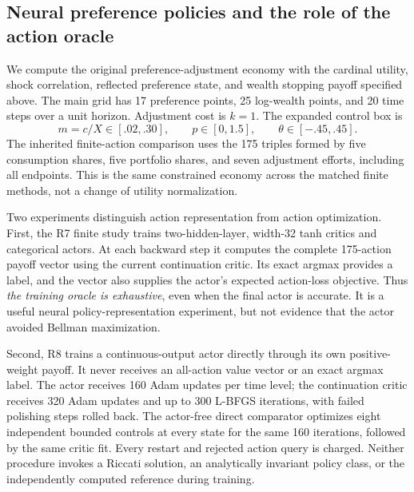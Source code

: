 \subsection{Neural preference policies and the role of the action oracle}\label{sec:ndu-neural}
We compute the original preference-adjustment economy with the cardinal utility, shock correlation, reflected preference state, and wealth stopping payoff specified above. The main grid has 17 preference points, 25 log-wealth points, and 20 time steps over a unit horizon. Adjustment cost is $k=1$. The expanded control box is
\[
 m=c/X\in[.02,.30],\qquad p\in[0,1.5],\qquad\theta\in[-.45,.45].
\]
The inherited finite-action comparison uses the 175 triples formed by five consumption shares, five portfolio shares, and seven adjustment efforts, including all endpoints. This is the same constrained economy across the matched finite methods, not a change of utility normalization.

Two experiments distinguish action representation from action optimization. First, the R7 finite study trains two-hidden-layer, width-32 tanh critics and categorical actors. At each backward step it computes the complete 175-action payoff vector using the current continuation critic. Its exact argmax provides a label, and the vector also supplies the actor's expected action-loss objective. Thus \emph{the training oracle is exhaustive}, even when the final actor is accurate. It is a useful neural policy-representation experiment, but not evidence that the actor avoided Bellman maximization.

Second, R8 trains a continuous-output actor directly through its own positive-weight payoff. It never receives an all-action value vector or an exact argmax label. The actor receives 160 Adam updates per time level; the continuation critic receives 320 Adam updates and up to 300 L-BFGS iterations, with failed polishing steps rolled back. The actor-free direct comparator optimizes eight independent bounded controls at every state for the same 160 iterations, followed by the same critic fit. Every restart and rejected action query is charged. Neither procedure invokes a Riccati solution, an analytically invariant policy class, or the independently computed reference during training.

